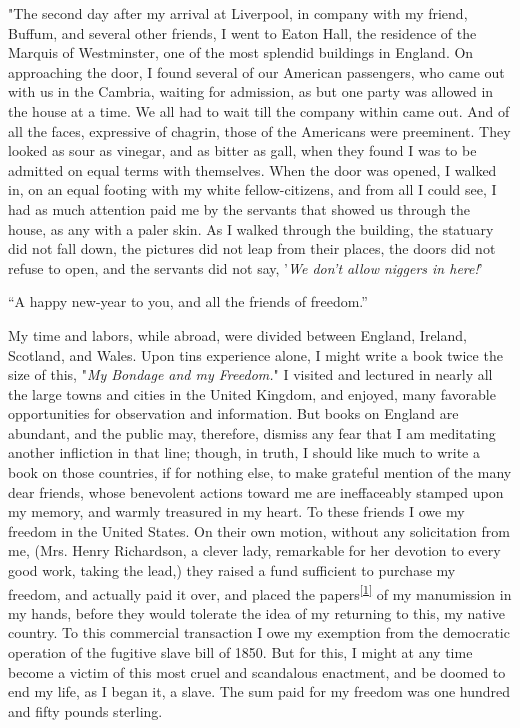 "The second day after my arrival at Liverpool, in company {}with my
friend, Buffum, and several other friends, I went to Eaton Hall, the
residence of the Marquis of Westminster, one of the most splendid
buildings in England. On approaching the door, I found several of our
American passengers, who came out with us in the Cambria, waiting for
admission, as but one party was allowed in the house at a time. We all
had to wait till the company within came out. And of all the faces,
expressive of chagrin, those of the Americans were preeminent. They
looked as sour as vinegar, and as bitter as gall, when they found I was
to be admitted on equal terms with themselves. When the door was opened,
I walked in, on an equal footing with my white fellow-citizens, and from
all I could see, I had as much attention paid me by the servants that
showed us through the house, as any with a paler skin. As I walked
through the building, the statuary did not fall down, the pictures did
not leap from their places, the doors did not refuse to open, and the
servants did not say, {'}\emph{We don't allow niggers in here!}{'}

``A happy new-year to you, and all the friends of freedom.''

My time and labors, while abroad, were divided between England, Ireland,
Scotland, and Wales. Upon tins experience alone, I might write a book
twice the size of this, "\emph{My Bondage and my Freedom.}" I visited
and lectured in nearly all the large towns and cities in the United
Kingdom, and enjoyed, many favorable opportunities for observation and
information. But books on England are abundant, and the public may,
therefore, dismiss any fear that I am meditating another infliction in
that line; though, in truth, I should like much to write a book on those
countries, if for nothing else, to make grateful mention of the many
dear friends, whose benevolent {}actions toward me are ineffaceably
stamped upon my memory, and warmly treasured in my heart. To these
friends I owe my freedom in the United States. On their own motion,
without any solicitation from me, (Mrs. Henry Richardson, a clever lady,
remarkable for her devotion to every good work, taking the lead,) they
raised a fund sufficient to purchase my freedom, and actually paid it
over, and placed the
papers\textsuperscript{\protect\hyperlink{cite_note-p374-1}{{[}1{]}}} of
{}my manumission in my hands, before they would tolerate the idea of my
returning to this, my native country. To this commercial transaction I
owe my exemption from the democratic operation of the fugitive slave
bill of 1850. But for this, I might at any time become a victim of this
most cruel and scandalous enactment, and be doomed to end my life, as I
began it, a slave. The sum paid for my freedom was one hundred and fifty
pounds sterling.

